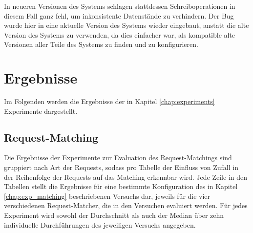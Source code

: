 \documentclass[12pt,a4paper]{report}
\begin{document}
In neueren Versionen des Systems schlagen stattdessen Schreiboperationen in diesem Fall ganz fehl, um inkonsistente Datenstände zu
verhindern. Der Bug wurde hier in eine aktuelle Version des Systems wieder eingebaut, anstatt die alte Version des Systems zu
verwenden, da dies einfacher war, als kompatible alte Versionen aller Teile des Systems zu finden und zu konfigurieren.



\chapter{Ergebnisse}
\label{chap:results}
Im Folgenden werden die Ergebnisse der in Kapitel \ref{chap:experiments} Experimente dargestellt.

\section{Request-Matching}
Die Ergebnisse der Experimente zur Evaluation des Request-Matchings sind gruppiert nach Art der Requests, sodass pro Tabelle
der Einfluss von Zufall in der Reihenfolge der Requests auf das Matching erkennbar wird.
Jede Zeile in den Tabellen stellt die Ergebnisse für eine bestimmte Konfiguration des in Kapitel \ref{chap:exp_matching}
beschriebenen Versuchs dar, jeweils für die vier verschiedenen Request-Matcher, die in den Versuchen evaluiert werden. Für jedes Experiment
wird sowohl der Durchschnitt als auch der Median über zehn individuelle Durchführungen des jeweiligen Versuchs angegeben.
\end{document}
